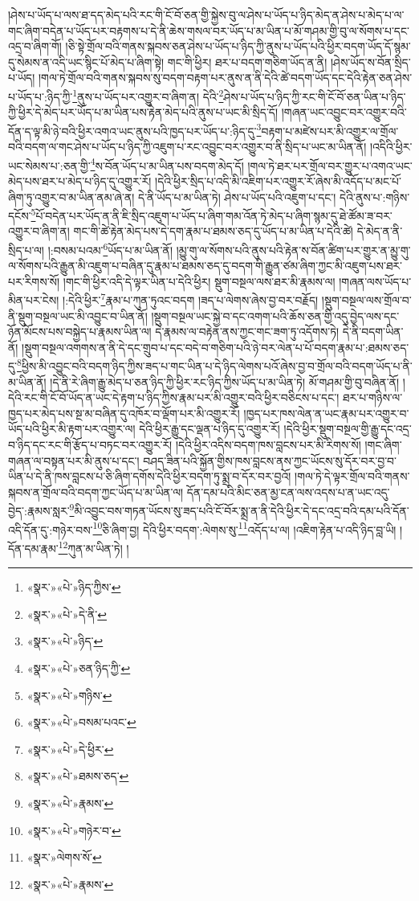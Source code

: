 །ཤེས་པ་ཡོད་པ་ལས་ཐ་དད་མེད་པའི་རང་གི་ངོ་བོ་ཅན་གྱི་སྐྱེས་བུ་ལ་ཤེས་པ་ཡོད་པ་ཉིད་མེད་ན་ཤེས་པ་མེད་པ་ལ་གང་ཞིག་བདེན་པ་ཡོད་པར་བརྟགས་པ་དེ་ནི་ཆེས་གསལ་བར་ཡོད་པ་མ་ཡིན་པ་མོ་གཤམ་གྱི་བུ་ལ་སོགས་པ་དང་འདྲ་བ་ཞིག་གོ། །ཅི་སྟེ་གྲོལ་བའི་གནས་སྐབས་ཅན་ཤེས་པ་ཡོད་པ་ཉིད་ཀྱི་ནུས་པ་ཡོད་པའི་ཕྱིར་བདག་ཡོད་དོ་སྙམ་དུ་སེམས་ན་འདི་ཡང་སྙིང་པོ་མེད་པ་ཞིག་སྟེ། གང་གི་ཕྱིར། ཐར་པ་བདག་གཅིག་ཡོད་ན་ནི། །ཤེས་ཡོད་ས་བོན་སྲིད་པ་ཡོད། །གལ་ཏེ་གྲོལ་བའི་གནས་སྐབས་སུ་བདག་བརྟག་པར་ནུས་ན་ནི་དེའི་ཚེ་བདག་ཡོད་དང་དེའི་རྟེན་ཅན་ཤེས་པ་ཡོད་པ་:ཉིད་ཀྱི་\footnote{«སྣར་»«པེ་»ཉིད་ཀྱིས་}ནུས་པ་ཡོད་པར་འགྱུར་བ་ཞིག་ན། དེའི་\footnote{«སྣར་»«པེ་»དེ་ནི་}ཤེས་པ་ཡོད་པ་ཉིད་ཀྱི་རང་གི་ངོ་བོ་ཅན་ཡིན་པ་ཉིད་ཀྱི་ཕྱིར་དེ་མེད་པར་ཡོད་པ་མ་ཡིན་པས་རྟེན་མེད་པའི་ནུས་པ་ཡང་མི་སྲིད་དོ། །གཞན་ཡང་འབྱུང་བར་འགྱུར་བའི་དོན་ད་ལྟ་མི་ཉེ་བའི་ཕྱིར་འགའ་ཡང་ནུས་པའི་ཁྱད་པར་ཡོད་པ་:ཉིད་དུ་\footnote{«སྣར་»«པེ་»ཉིད་}བརྟག་པ་མཛེས་པར་མི་འགྱུར་ལ་གྲོལ་བའི་བདག་ལ་གང་ཤེས་པ་ཡོད་པ་ཉིད་ཀྱི་འཇུག་པ་རང་འབྱུང་བར་འགྱུར་བ་ནི་སྲིད་པ་ཡང་མ་ཡིན་ནོ། །འདིའི་ཕྱིར་ཡང་སེམས་པ་:ཅན་གྱི་\footnote{«སྣར་»«པེ་»ཅན་ཉིད་ཀྱི་}ས་བོན་ཡོད་པ་མ་ཡིན་པས་བདག་མེད་དོ། །གལ་ཏེ་ཐར་པར་གྲོལ་བར་གྱུར་པ་འགའ་ཡང་མེད་པས་ཐར་པ་མེད་པ་ཉིད་དུ་འགྱུར་རོ། །དེའི་ཕྱིར་སྲིད་པ་འདི་མི་འཇིག་པར་འགྱུར་རོ་ཞེས་མི་འདོད་པ་མང་པོ་ཞིག་ཏུ་འགྱུར་བ་མ་ཡིན་ནམ་ཞེ་ན། དེ་ནི་ཡོད་པ་མ་ཡིན་ཏེ། ཤེས་པ་ཡོད་པའི་འཇུག་པ་དང་། དེའི་ནུས་པ་:གཉིས་དངོས་\footnote{«སྣར་»«པེ་»གཉིས་}པོ་བདེན་པར་ཡོད་ན་ནི་ཇི་སྲིད་འཇུག་པ་ཡོད་པ་ཞིག་གམ་འོན་ཏེ་མེད་པ་ཞིག་སྙམ་དུ་ཐེ་ཚོམ་ཟ་བར་འགྱུར་བ་ཞིག་ན། གང་གི་ཚེ་རྟེན་མེད་པས་དེ་དག་རྣམ་པ་ཐམས་ཅད་དུ་ཡོད་པ་མ་ཡིན་པ་དེའི་ཚེ། དེ་མེད་ན་ནི་སྲིད་པ་ལ། །:བསམ་པའམ་\footnote{«སྣར་»«པེ་»བསམ་པའང་}ཡོད་པ་མ་ཡིན་ནོ། །མྱུ་གུ་ལ་སོགས་པའི་ནུས་པའི་རྟེན་ས་བོན་ཚིག་པར་གྱུར་ན་མྱུ་གུ་ལ་སོགས་པའི་རྒྱུན་མི་འཇུག་པ་བཞིན་དུ་རྣམ་པ་ཐམས་ཅད་དུ་བདག་གི་རྒྱུན་ཙམ་ཞིག་ཀྱང་མི་འཇུག་པས་ཐར་པར་རིགས་སོ། །གང་གི་ཕྱིར་འདི་དེ་ལྟར་ཡིན་པ་དེའི་ཕྱིར། སྡུག་བསྔལ་ལས་ཐར་མི་རྣམས་ལ། །གཞན་ལས་ཡོད་པ་མིན་པར་ངེས། །:དེའི་ཕྱིར་\footnote{«སྣར་»«པེ་»དེ་ཕྱིར་}རྣམ་པ་ཀུན་ཏུའང་བདག །ཟད་པ་ལེགས་ཞེས་བྱ་བར་བརྗོད། །སྡུག་བསྔལ་ལས་གྲོལ་བ་ནི་སྡུག་བསྔལ་ཡང་མི་འབྱུང་བ་ཡིན་ནོ། །སྡུག་བསྔལ་ཡང་སྐྱེ་བ་དང་འགག་པའི་ཆོས་ཅན་གྱི་འདུ་བྱེད་ལས་དང་ཉོན་མོངས་པས་བསྐྱེད་པ་རྣམས་ཡིན་ལ། དེ་རྣམས་ལ་བརྟེན་ནས་ཀྱང་གང་ཟག་ཏུ་འདོགས་ཏེ། དེ་ནི་བདག་ཡིན་ནོ། །སྡུག་བསྔལ་འགགས་ན་ནི་དེ་དང་གྲུབ་པ་དང་བདེ་བ་གཅིག་པའི་ཉེ་བར་ལེན་པ་པོ་བདག་རྣམ་པ་:ཐམས་ཅད་དུ་\footnote{«སྣར་»«པེ་»ཐམས་ཅད་}ཕྱིས་མི་འབྱུང་བའི་བདག་ཉིད་ཀྱིས་ཟད་པ་གང་ཡིན་པ་དེ་ཉིད་ལེགས་པའོ་ཞེས་བྱ་བ་གྲོལ་བའི་བདག་ཡོད་པ་ནི་མ་ཡིན་ནོ། །དེ་ནི་རེ་ཞིག་རྒྱུ་མེད་པ་ཅན་ཉིད་ཀྱི་ཕྱིར་རང་ཉིད་ཀྱིས་ཡོད་པ་མ་ཡིན་ཏེ། མོ་གཤམ་གྱི་བུ་བཞིན་ནོ། །དེའི་རང་གི་ངོ་བོ་ཡོད་ན་ཡང་དེ་རྟག་པ་ཉིད་ཀྱིས་རྣམ་པར་མི་འགྱུར་བའི་ཕྱིར་བཅིངས་པ་དང་། ཐར་པ་གཉིས་ལ་ཁྱད་པར་མེད་པས་སྔ་མ་བཞིན་དུ་འཁོར་བ་ལྡོག་པར་མི་འགྱུར་རོ། །ཁྱད་པར་ཁས་ལེན་ན་ཡང་རྣམ་པར་འགྱུར་བ་ཡོད་པའི་ཕྱིར་མི་རྟག་པར་འགྱུར་ལ། དེའི་ཕྱིར་རྒྱུ་དང་ལྡན་པ་ཉིད་དུ་འགྱུར་རོ། །དེའི་ཕྱིར་སྡུག་བསྔལ་གྱི་རྒྱུ་དང་འདྲ་བ་ཉིད་དང་རང་གི་རྩོད་པ་བཏང་བར་འགྱུར་རོ། །དེའི་ཕྱིར་འདིས་བདག་ཁས་བླངས་པར་མི་རིགས་སོ། །གང་ཞིག་གཞན་ལ་བསྟན་པར་མི་ནུས་པ་དང་། བཤད་ཟིན་པའི་སྐྱོན་གྱིས་ཁས་བླངས་ནས་ཀྱང་ཡོངས་སུ་དོར་བར་བྱ་བ་ཡིན་པ་དེ་ནི་ཁས་བླངས་པ་ཅི་ཞིག་དགོས་དེའི་ཕྱིར་བདག་ཏུ་སྨྲ་བ་དོར་བར་བྱའོ། །གལ་ཏེ་དེ་ལྟར་གྲོལ་བའི་གནས་སྐབས་ན་གྲོལ་བའི་བདག་ཀྱང་ཡོད་པ་མ་ཡིན་ལ། དོན་དམ་པའི་མིང་ཅན་མྱ་ངན་ལས་འདས་པ་ན་ཡང་འདུ་བྱེད་:རྣམས་སླར་\footnote{«སྣར་»«པེ་»རྣམས་}མི་འབྱུང་བས་གཏན་ཡོངས་སུ་ཟད་པའི་ངོ་བོར་སྨྲ་ན་ནི་དེའི་ཕྱིར་དེ་དང་འདྲ་བའི་དམ་པའི་དོན་འདི་དོན་དུ་:གཉེར་བས་\footnote{«སྣར་»«པེ་»གཉེར་བ་}ཅི་ཞིག་བྱ། དེའི་ཕྱིར་བདག་:ལེགས་སུ་\footnote{«སྣར་»ལེགས་སོ་}འདོད་པ་ལ། །འཇིག་རྟེན་པ་འདི་ཉིད་བླ་ཡི། །དོན་དམ་རྣམ་\footnote{«སྣར་»«པེ་»རྣམས་}ཀུན་མ་ཡིན་ཏེ། །
